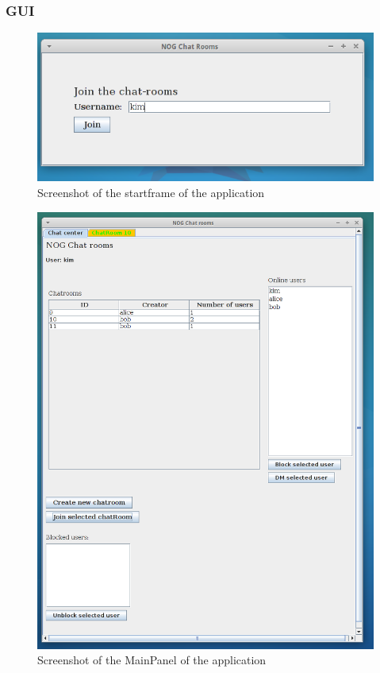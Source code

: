\documentclass[a4paper, 11pt]{article}
\begin{document}
\subsubsection{GUI}
\begin{figure}[H]
\includegraphics[scale=0.60]{assignment2_1.png}
\caption{Screenshot of the startframe of the application}
\end{figure}
\begin{figure}[H]
\includegraphics[scale=0.50]{assignment2_3.png}
\caption{Screenshot of the MainPanel of the application}
\end{figure}
\end{document}
